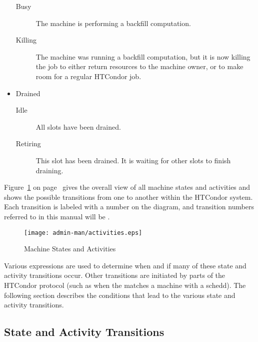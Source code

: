 \begin{itemize}
\begin{description}
\item[Busy] The machine is performing a backfill computation.

\item[Killing] The machine was running a backfill computation, but it
  is now killing the job to either return resources to the machine
  owner, or to make room for a regular HTCondor job.

\end{description}

\item Drained
\begin{description}

\item[Idle] All slots have been drained.

\item[Retiring] This slot has been drained.  It is waiting for other
  slots to finish draining.

\end{description}

\end{itemize}

Figure~\ref{fig:machine-activities} on
page~\pageref{fig:machine-activities} gives the overall view of all
machine states and activities and shows the possible transitions
from one to another within the HTCondor system.  
Each transition is labeled with a number on the diagram, and
transition numbers referred to in this manual will be .  

\begin{figure}[hbt]
\centering
\texttt{[image: admin-man/activities.eps]}
\caption{\label{fig:machine-activities}Machine States and Activities}
\end{figure}

Various expressions are used to determine when and if many of these
state and activity transitions occur.  Other transitions are initiated
by parts of the HTCondor protocol (such as when the 
matches a machine with a schedd).  The following section describes the
conditions that lead to the various state and activity transitions.

\subsection{\label{sec:State-and-Activity-Transitions}
State and Activity Transitions}

